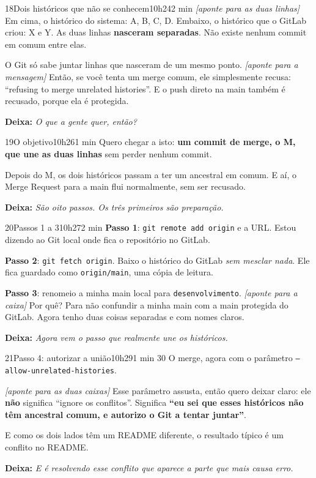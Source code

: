 \documentclass[11pt,a4paper]{article}
\newcommand{\acao}[1]{{\color{ouroMB!75!black}\small\itshape [#1]}}
\newcommand{\deixa}[1]{\par{\color{verdeMB}\small\bfseries \faLongArrowAltRight\; Deixa:} {\small\itshape #1}}
\newcommand{\cmd}[1]{\texttt{\color{azulMB}#1}}
\begin{document}
\begin{slide}{18}{Dois históricos que não se conhecem}{10h24}{2 min}
\acao{aponte para as duas linhas}
Em cima, o histórico do sistema: A, B, C, D. Embaixo, o histórico que o GitLab criou: X e Y. As duas linhas \textbf{nasceram separadas}. Não existe nenhum commit em comum entre elas.

O Git só sabe juntar linhas que nasceram de um mesmo ponto. \acao{aponte para a mensagem} Então, se você tenta um merge comum, ele simplesmente recusa: \enquote{refusing to merge unrelated histories}. E o push direto na main também é recusado, porque ela é protegida.
\deixa{O que a gente quer, então?}
\end{slide}

\begin{slide}{19}{O objetivo}{10h26}{1 min}
Quero chegar a isto: \textbf{um commit de merge, o M, que une as duas linhas} sem perder nenhum commit.

Depois do M, os dois históricos passam a ter um ancestral em comum. E aí, o Merge Request para a main flui normalmente, sem ser recusado.
\deixa{São oito passos. Os três primeiros são preparação.}
\end{slide}

\begin{slide}{20}{Passos 1 a 3}{10h27}{2 min}
\textbf{Passo 1}: \cmd{git remote add origin} e a URL. Estou dizendo ao Git local onde fica o repositório no GitLab.

\textbf{Passo 2}: \cmd{git fetch origin}. Baixo o histórico do GitLab \emph{sem mesclar nada}. Ele fica guardado como \texttt{origin/main}, uma cópia de leitura.

\textbf{Passo 3}: renomeio a minha main local para \texttt{desenvolvimento}. \acao{aponte para a caixa} Por quê? Para não confundir a minha main com a main protegida do GitLab. Agora tenho duas coisas separadas e com nomes claros.
\deixa{Agora vem o passo que realmente une os históricos.}
\end{slide}

\begin{slide}{21}{Passo 4: autorizar a união}{10h29}{1 min 30}
O merge, agora com o parâmetro \cmd{--allow-unrelated-histories}.

\acao{aponte para as duas caixas} Esse parâmetro assusta, então quero deixar claro: ele \textbf{não} significa \enquote{ignore os conflitos}. Significa \textbf{\enquote{eu sei que esses históricos não têm ancestral comum, e autorizo o Git a tentar juntar}}.

E como os dois lados têm um README diferente, o resultado típico é um conflito no README.
\deixa{E é resolvendo esse conflito que aparece a parte que mais causa erro.}
\end{slide}
\end{document}
